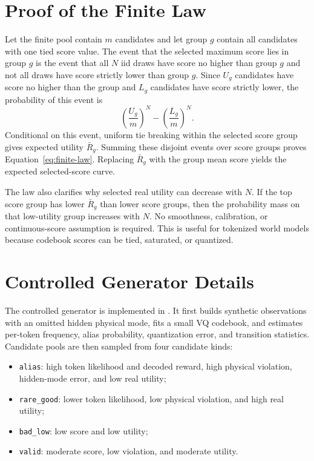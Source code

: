 \section{Proof of the Finite Law}
\label{app:proof}

Let the finite pool contain $m$ candidates and let group $g$ contain all candidates with one tied score value. The event that the selected maximum score lies in group $g$ is the event that all $N$ iid draws have score no higher than group $g$ and not all draws have score strictly lower than group $g$. Since $U_g$ candidates have score no higher than the group and $L_g$ candidates have score strictly lower, the probability of this event is
\[
\left(\frac{U_g}{m}\right)^N -
\left(\frac{L_g}{m}\right)^N.
\]
Conditional on this event, uniform tie breaking within the selected score group gives expected utility $\bar R_g$. Summing these disjoint events over score groups proves Equation~\ref{eq:finite-law}. Replacing $\bar R_g$ with the group mean score yields the expected selected-score curve.

The law also clarifies why selected real utility can decrease with $N$. If the top score group has lower $\bar R_g$ than lower score groups, then the probability mass on that low-utility group increases with $N$. No smoothness, calibration, or continuous-score assumption is required. This is useful for tokenized world models because codebook scores can be tied, saturated, or quantized.

\section{Controlled Generator Details}
\label{app:details}

The controlled generator is implemented in . It first builds synthetic observations with an omitted hidden physical mode, fits a small VQ codebook, and estimates per-token frequency, alias probability, quantization error, and transition statistics. Candidate pools are then sampled from four candidate kinds:
\begin{itemize}
\item \texttt{alias}: high token likelihood and decoded reward, high physical violation, hidden-mode error, and low real utility;
\item \texttt{rare\_good}: lower token likelihood, low physical violation, and high real utility;
\item \texttt{bad\_low}: low score and low utility;
\item \texttt{valid}: moderate score, low violation, and moderate utility.
\end{itemize}

